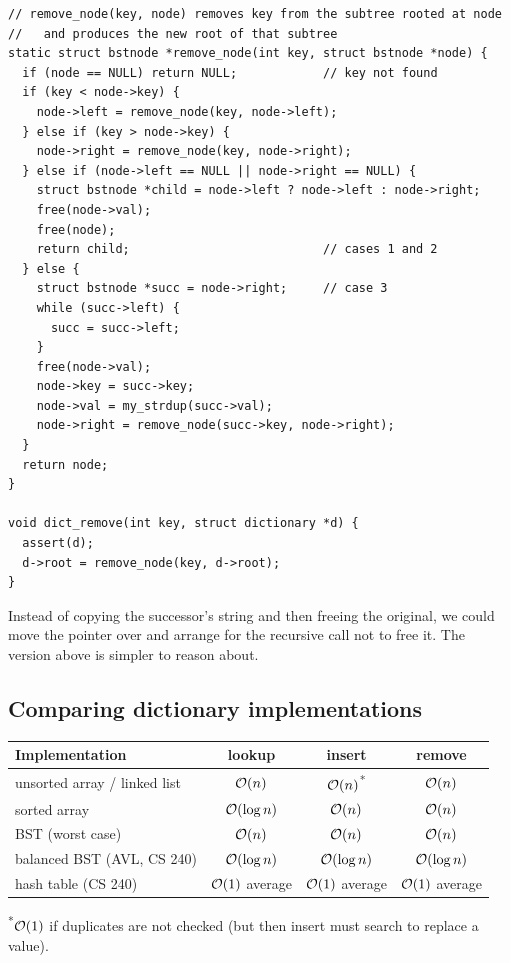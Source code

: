 \begin{lstlisting}[style=c]
// remove_node(key, node) removes key from the subtree rooted at node
//   and produces the new root of that subtree
static struct bstnode *remove_node(int key, struct bstnode *node) {
  if (node == NULL) return NULL;            // key not found
  if (key < node->key) {
    node->left = remove_node(key, node->left);
  } else if (key > node->key) {
    node->right = remove_node(key, node->right);
  } else if (node->left == NULL || node->right == NULL) {
    struct bstnode *child = node->left ? node->left : node->right;
    free(node->val);
    free(node);
    return child;                           // cases 1 and 2
  } else {
    struct bstnode *succ = node->right;     // case 3
    while (succ->left) {
      succ = succ->left;
    }
    free(node->val);
    node->key = succ->key;
    node->val = my_strdup(succ->val);
    node->right = remove_node(succ->key, node->right);
  }
  return node;
}

void dict_remove(int key, struct dictionary *d) {
  assert(d);
  d->root = remove_node(key, d->root);
}
\end{lstlisting}
\begin{aside}
Instead of copying the successor's string and then freeing the original, we could move the
pointer over and arrange for the recursive call not to free it. The version above is simpler to
reason about.
\end{aside}

\subsection{Comparing dictionary implementations}

\begin{center}
\begin{tabular}{lccc}
  \toprule
  Implementation & lookup & insert & remove \\
  \midrule
  unsorted array / linked list & $\mathcal{O}(n)$ & $\mathcal{O}(n)$\textsuperscript{*} & $\mathcal{O}(n)$ \\
  sorted array & $\mathcal{O}(\log n)$ & $\mathcal{O}(n)$ & $\mathcal{O}(n)$ \\
  BST (worst case) & $\mathcal{O}(n)$ & $\mathcal{O}(n)$ & $\mathcal{O}(n)$ \\
  balanced BST (AVL, CS 240) & $\mathcal{O}(\log n)$ & $\mathcal{O}(\log n)$ & $\mathcal{O}(\log n)$ \\
  hash table (CS 240) & $\mathcal{O}(1)$ average & $\mathcal{O}(1)$ average & $\mathcal{O}(1)$ average \\
  \bottomrule
\end{tabular}
\end{center}
\textsuperscript{*}$\mathcal{O}(1)$ if duplicates are not checked (but then insert must search to
replace a value).


